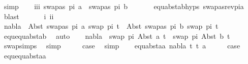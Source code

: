 \begin{isabellebody}
\ simp\isanewline
\isanewline
\ \ \isamarkupfalse%
\ iii{\isacharcolon}{\kern0pt}\ {\isachardoublequoteopen}swapas\ pi\ a\ {\isasymnoteq}\ swapas\ pi\ b{\isachardoublequoteclose}\ \isanewline
\ \ \ \ \isamarkupfalse%
\ equ{\isacharunderscore}{\kern0pt}abst{\isacharunderscore}{\kern0pt}ab{\isachardot}{\kern0pt}hyps{\isacharparenleft}{\kern0pt}{}{\isacharparenright}{\kern0pt}\ swapas{\isacharunderscore}{\kern0pt}rev{\isacharunderscore}{\kern0pt}pi{\isacharunderscore}{\kern0pt}a\ \isamarkupfalse%
\ blast\isanewline
\ \ \isanewline
\ \ \isamarkupfalse%
\ i\ ii\isanewline
\ \ \isamarkupfalse%
\ {\isachardoublequoteopen}nabla\ {\isasymturnstile}\ Abst\ {\isacharparenleft}{\kern0pt}swapas\ pi\ a{\isacharparenright}{\kern0pt}\ {\isacharparenleft}{\kern0pt}swap\ pi\ t{}{\isacharprime}{\kern0pt}{\isacharparenright}{\kern0pt}\ {\isasymapprox}\ Abst\ {\isacharparenleft}{\kern0pt}swapas\ pi\ b{\isacharparenright}{\kern0pt}\ {\isacharparenleft}{\kern0pt}swap\ pi\ t{}{\isacharprime}{\kern0pt}{\isacharparenright}{\kern0pt}{\isachardoublequoteclose}\isanewline
\ \ \ \ \isamarkupfalse%
\ equ{\isachardot}{\kern0pt}equ{\isacharunderscore}{\kern0pt}abst{\isacharunderscore}{\kern0pt}ab\ \isamarkupfalse%
\ auto\isanewline
\ \ \isamarkupfalse%
\ {\isachardoublequoteopen}nabla\ {\isasymturnstile}\ swap\ pi\ {\isacharparenleft}{\kern0pt}Abst\ a\ t{}{\isacharprime}{\kern0pt}{\isacharparenright}{\kern0pt}\ {\isasymapprox}\ swap\ pi\ {\isacharparenleft}{\kern0pt}Abst\ b\ t{}{\isacharprime}{\kern0pt}{\isacharparenright}{\kern0pt}{\isachardoublequoteclose}\isanewline
\ \ \ \ \isamarkupfalse%
\ swap{\isachardot}{\kern0pt}simps{\isacharparenleft}{\kern0pt}{}{\isacharparenright}{\kern0pt}\ \isamarkupfalse%
\ simp\isanewline
\ \ \isamarkupfalse%
\ \isamarkupfalse%
\ {\isacharquery}{\kern0pt}case\ \isamarkupfalse%
\ simp\isanewline
{}\isamarkupfalse%
\isanewline
\ \ \isamarkupfalse%
\ {\isacharparenleft}{\kern0pt}equ{\isacharunderscore}{\kern0pt}abst{\isacharunderscore}{\kern0pt}aa\ nabla\ t{}{\isacharprime}{\kern0pt}\ t{}{\isacharprime}{\kern0pt}\ a{\isacharparenright}{\kern0pt}\isanewline
\ \ \isamarkupfalse%
\ \isamarkupfalse%
\ {\isacharquery}{\kern0pt}case\isanewline
\ \ \ \ \isamarkupfalse%
\ equ{\isachardot}{\kern0pt}equ{\isacharunderscore}{\kern0pt}abst{\isacharunderscore}{\kern0pt}aa\ \isamarkupfalse%

\end{isabellebody}
